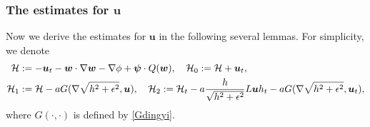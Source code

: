 \documentclass[11pt,reqno]{amsart}
\numberwithin{rk}{section}
\numberwithin{prop}{section}
\numberwithin{mydef}{section}
\numberwithin{lem}{section}
\numberwithin{equation}{section}
\numberwithin{thm}{section}
\begin{document}
\smallskip
\subsubsection{The estimates for $\boldsymbol{u}$}
Now we derive the estimates for $\boldsymbol{u}$ in the following several lemmas.
For simplicity, we denote 
\begin{equation*}
\begin{aligned}
\mathcal{H}&:=-\boldsymbol{u}_t-\boldsymbol{w}\cdot\nabla \boldsymbol{w}-\nabla\phi+\boldsymbol{\psi}\cdot Q(\boldsymbol{w}),\quad \mathcal{H}_0:=\mathcal{H}+\boldsymbol{u}_t,\notag\\
\mathcal{H}_1&:=\mathcal{H}-aG(\nabla\sqrt{h^2+\epsilon^2},\boldsymbol{u}),\quad 
\mathcal{H}_2:=\mathcal{H}_t -a\frac{h}{\sqrt{h^2+\epsilon^2}} L\boldsymbol{u}
h_t-aG(\nabla\sqrt{h^2+\epsilon^2},\boldsymbol{u}_t),\notag
\end{aligned}
\end{equation*}
where $G(\cdot,\cdot)$ is defined by \eqref{Gdingyi}.
\end{document}
